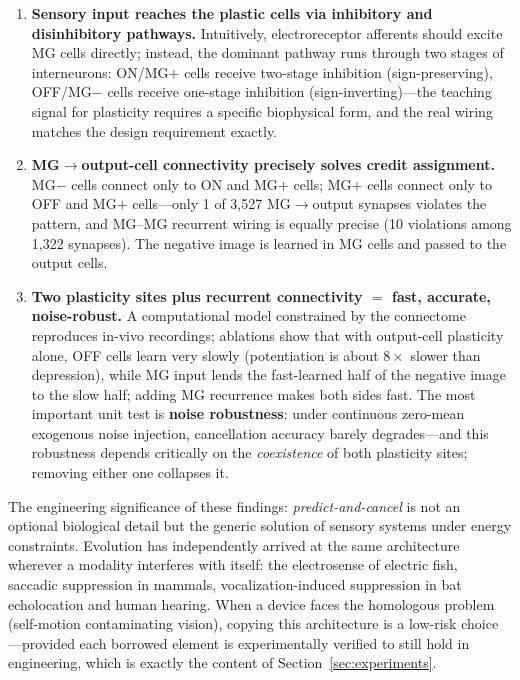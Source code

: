 \documentclass[12pt,a4paper]{article}
\begin{document}
\begin{enumerate}
  \item \textbf{Sensory input reaches the plastic cells via inhibitory and disinhibitory pathways.} Intuitively, electroreceptor afferents should excite MG cells directly; instead, the dominant pathway runs through two stages of interneurons: ON/MG$+$ cells receive two-stage inhibition (sign-preserving), OFF/MG$-$ cells receive one-stage inhibition (sign-inverting)---the teaching signal for plasticity requires a specific biophysical form, and the real wiring matches the design requirement exactly.
  \item \textbf{MG$\to$output-cell connectivity precisely solves credit assignment.} MG$-$ cells connect only to ON and MG$+$ cells; MG$+$ cells connect only to OFF and MG$+$ cells---only 1 of 3{,}527 MG$\to$output synapses violates the pattern, and MG--MG recurrent wiring is equally precise (10 violations among 1{,}322 synapses). The negative image is learned in MG cells and passed to the output cells.
  \item \textbf{Two plasticity sites plus recurrent connectivity $=$ fast, accurate, noise-robust.} A computational model constrained by the connectome reproduces in-vivo recordings; ablations show that with output-cell plasticity alone, OFF cells learn very slowly (potentiation is about $8\times$ slower than depression), while MG input lends the fast-learned half of the negative image to the slow half; adding MG recurrence makes both sides fast. The most important unit test is \textbf{noise robustness}: under continuous zero-mean exogenous noise injection, cancellation accuracy barely degrades---and this robustness depends critically on the \emph{coexistence} of both plasticity sites; removing either one collapses it.
\end{enumerate}

The engineering significance of these findings: \emph{predict-and-cancel} is not an optional biological detail but the generic solution of sensory systems under energy constraints. Evolution has independently arrived at the same architecture wherever a modality interferes with itself: the electrosense of electric fish, saccadic suppression in mammals, vocalization-induced suppression in bat echolocation and human hearing. When a device faces the homologous problem (self-motion contaminating vision), copying this architecture is a low-risk choice---provided each borrowed element is experimentally verified to still hold in engineering, which is exactly the content of Section~\ref{sec:experiments}.
\end{document}
